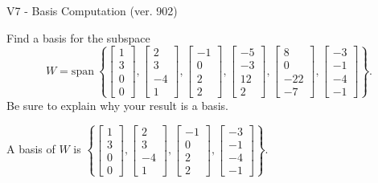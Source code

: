 \begin{exercise}
  \begin{exerciseTitle}V7 - Basis Computation (ver. 902)\end{exerciseTitle}
  \begin{exerciseStatement}
    Find a basis for the subspace 
\[W=\mathrm{span}\ \left\{\left[\begin{array}{r}
1 \\
3 \\
0 \\
0
\end{array}\right] , \left[\begin{array}{r}
2 \\
3 \\
-4 \\
1
\end{array}\right] , \left[\begin{array}{r}
-1 \\
0 \\
2 \\
2
\end{array}\right] , \left[\begin{array}{r}
-5 \\
-3 \\
12 \\
2
\end{array}\right] , \left[\begin{array}{r}
8 \\
0 \\
-22 \\
-7
\end{array}\right] , \left[\begin{array}{r}
-3 \\
-1 \\
-4 \\
-1
\end{array}\right]\right\}.\]
 Be sure to explain why your result is a basis.


  \end{exerciseStatement}
  \begin{exerciseAnswer}
   A basis of \(W\) is  \(\left\{\left[\begin{array}{r}
1 \\
3 \\
0 \\
0
\end{array}\right] , \left[\begin{array}{r}
2 \\
3 \\
-4 \\
1
\end{array}\right] , \left[\begin{array}{r}
-1 \\
0 \\
2 \\
2
\end{array}\right] , \left[\begin{array}{r}
-3 \\
-1 \\
-4 \\
-1
\end{array}\right]\right\}\).
  


  \end{exerciseAnswer}
\end{exercise}